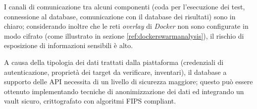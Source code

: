 \documentclass[../main.tex]{subfiles}
\begin{document}
I canali di comunicazione tra alcuni componenti (coda per l'esecuzione dei test, connessione al database, comunicazione con il database dei risultati) sono in chiaro; considerando inoltre che le reti \textit{overlay} di \textit{Docker} non sono configurate in modo cifrato (come illustrato in sezione \ref{ref:dockerswarmanalysis}), il rischio di esposizione di informazioni sensibili è alto.

A causa della tipologia dei dati trattati dalla piattaforma (credenziali di autenticazione, proprietà dei target da verificare, inventari), il database a supporto delle API necessita di un livello di sicurezza maggiore; questo può essere ottenuto implementando tecniche di anonimizzazione dei dati ed integrando un vault sicuro, crittografato con algoritmi FIPS compliant.

\end{document}
